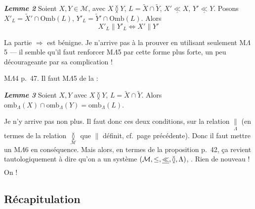 \documentclass[11pt,a4paper]{article}
\begin{document}
\textbf{\emph{Lemme 2}} Soient $X, Y \in \mathcal{M}$, avec $X \between Y$, $L = \widetilde{X} \cap \widetilde{Y}$, $X' \underline{\ll} X$, $Y' \underline{\ll} Y$. Posons $X'_L = \widetilde{X}' \cap \mathrm{Omb}(L)$, $Y'_L = \widetilde{Y}' \cap \mathrm{Omb}(L)$. Alors
\[
  X'_L \parallel Y'_L \iff X' \parallel Y'
\]

La partie  \struck{\ill{}} \struck{$\Longrightarrow$}  $\Longrightarrow$ est bénigne. Je n'arrive pas à la prouver en utilisant seulement M$\Lambda$5 — il semble qu'il faut renforcer M$\Lambda$5 par cette forme plus forte, un peu décourageante par sa complication !

    M$\Lambda$4  p.~47. Il faut   M$\Lambda$5 de la  :

\textbf{\emph{Lemme 3}} Soient $X, Y$ avec $X \between Y$, $L = \widetilde{X} \cap \widetilde{Y}$.
 
Alors $\mathrm{omb}_{\Lambda}(X) \cap \mathrm{omb}_{\Lambda}(Y) = \mathrm{omb}_{\Lambda}(L)$.

Je n'y arrive pas non plus. Il faut donc  ces deux conditions, sur la relation $\underset{\Lambda}{\parallel}$ (en termes de la relation $\underset{\mathcal{M}}{\between}$ que $\parallel$ définit, cf.\ page précédente). Donc il faut mettre un M$\Lambda$6 en conséquence. Mais alors, en termes de la proposition p.~42, ça revient tautologiquement à dire qu'on a un système $(\mathcal{M}, \leq, \struck{\ll}, \between, \Lambda)$,   . Rien de nouveau ! On   !

\subsection{Récapitulation}
\end{document}
